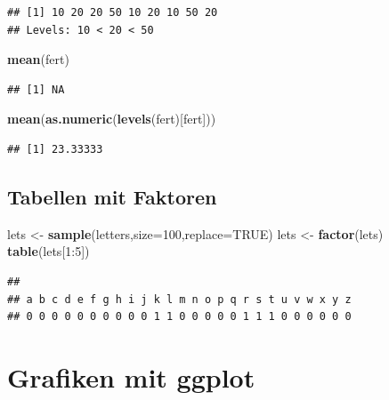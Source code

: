 \documentclass[]{article}
\newenvironment{Shaded}{\begin{snugshade}}{\end{snugshade}}
\newcommand{\KeywordTok}[1]{\textcolor[rgb]{0.13,0.29,0.53}{\textbf{{#1}}}}
\newcommand{\DataTypeTok}[1]{\textcolor[rgb]{0.13,0.29,0.53}{{#1}}}
\newcommand{\DecValTok}[1]{\textcolor[rgb]{0.00,0.00,0.81}{{#1}}}
\newcommand{\StringTok}[1]{\textcolor[rgb]{0.31,0.60,0.02}{{#1}}}
\newcommand{\OtherTok}[1]{\textcolor[rgb]{0.56,0.35,0.01}{{#1}}}
\newcommand{\NormalTok}[1]{{#1}}
\begin{document}
\begin{verbatim}
## [1] 10 20 20 50 10 20 10 50 20
## Levels: 10 < 20 < 50
\end{verbatim}

\begin{Shaded}
\begin{Highlighting}[]
\KeywordTok{mean}\NormalTok{(fert)}
\end{Highlighting}
\end{Shaded}

\begin{verbatim}
## [1] NA
\end{verbatim}

\begin{Shaded}
\begin{Highlighting}[]
\KeywordTok{mean}\NormalTok{(}\KeywordTok{as.numeric}\NormalTok{(}\KeywordTok{levels}\NormalTok{(fert)[fert]))}
\end{Highlighting}
\end{Shaded}

\begin{verbatim}
## [1] 23.33333
\end{verbatim}

\subsection{Tabellen mit Faktoren}\label{tabellen-mit-faktoren}

\begin{Shaded}
\begin{Highlighting}[]
\NormalTok{lets <-}\StringTok{ }\KeywordTok{sample}\NormalTok{(letters,}\DataTypeTok{size=}\DecValTok{100}\NormalTok{,}\DataTypeTok{replace=}\OtherTok{TRUE}\NormalTok{)}
\NormalTok{lets <-}\StringTok{ }\KeywordTok{factor}\NormalTok{(lets)}
\KeywordTok{table}\NormalTok{(lets[}\DecValTok{1}\NormalTok{:}\DecValTok{5}\NormalTok{])}
\end{Highlighting}
\end{Shaded}

\begin{verbatim}
## 
## a b c d e f g h i j k l m n o p q r s t u v w x y z 
## 0 0 0 0 0 0 0 0 0 0 1 1 0 0 0 0 0 1 1 1 0 0 0 0 0 0
\end{verbatim}

\section{Grafiken mit ggplot}\label{grafiken-mit-ggplot}
\end{document}
